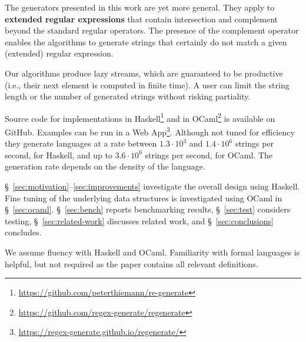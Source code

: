 The generators presented in this work are yet more general. They
apply to \textbf{extended regular expressions} that contain
intersection and complement beyond the standard regular operators. The presence
of the complement operator enables the algorithms to generate strings
that certainly do not match a given (extended) regular expression.

Our algorithms produce lazy streams, which are guaranteed to be
productive (i.e., their next element is computed in finite time). A
user can limit the string length or the number of generated strings
without risking partiality.

Source code for implementations in Haskell\footnote{
  \url{https://github.com/peterthiemann/re-generate}
}
and in OCaml\footnote{%
  \url{https://github.com/regex-generate/regenerate}} is available
on GitHub. Examples can be run in a Web App\footnote{%
  \url{https://regex-generate.github.io/regenerate/}}.  Although
not tuned for efficiency they generate languages at a rate
between $1.3\cdot10^3$ and $1.4\cdot10^6$ strings per second, for
Haskell, and up to $3.6\cdot10^6$ strings per second, for OCaml. The
generation rate depends on the density of the language.

\S~\ref{sec:motivation}--\ref{sec:improvements} investigate the
overall design using Haskell. Fine tuning of the underlying data
structures is investigated using OCaml in \S~\ref{sec:ocaml}.
\S~\ref{sec:bench} reports benchmarking results, \S~\ref{sec:test}
considers testing, \S~\ref{sec:related-work} discusses related work,
and \S~\ref{sec:conclusions} concludes.

We assume fluency with Haskell and OCaml. 
Familiarity with formal languages is helpful, but not required as the
paper contains all relevant definitions. 

